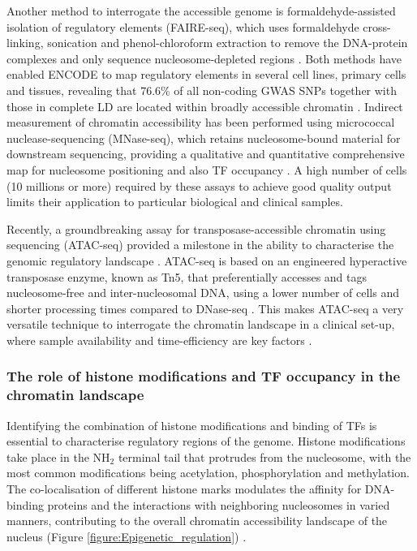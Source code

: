 Another method to interrogate the accessible genome is formaldehyde-assisted isolation of regulatory elements (FAIRE-seq), which uses formaldehyde cross-linking, sonication and phenol-chloroform extraction to remove the DNA-protein complexes and only sequence nucleosome-depleted regions \parencite{Giresi2006}. Both methods have enabled ENCODE to map regulatory elements in several cell lines, primary cells and tissues, revealing that 76.6\% of all non-coding GWAS SNPs together with those in complete LD are located within broadly accessible chromatin  \parencite{ENCODE2007,Buck2014,Gaulton2010, Maurano2012}. 
Indirect measurement of chromatin accessibility has been performed using micrococcal nuclease-sequencing (MNase-seq), which retains nucleosome-bound material for downstream sequencing, providing a qualitative and quantitative comprehensive map for nucleosome positioning and also TF occupancy \parencite{Axel1975,Ponts2010}. A high number of cells (10 millions or more) required by these assays to achieve good quality output limits their application to particular biological and clinical samples. 

Recently, a groundbreaking assay for transposase-accessible chromatin using sequencing (ATAC-seq) provided a milestone in the ability to characterise the genomic regulatory landscape \parencite{Buenrostro2013}. ATAC-seq is based on an engineered hyperactive transposase enzyme, known as Tn5, that preferentially accesses and tags nucleosome-free and inter-nucleosomal DNA, using a lower number of cells and shorter processing times compared to DNase-seq \parencite{Gradman2008, Adey2010}. This makes ATAC-seq a very versatile technique to interrogate the chromatin landscape in a clinical set-up, where sample availability and time-efficiency are key factors \parencite{Scharer2016,Qu2015,Qu2017}. 


\subsubsection{The role of histone modifications and TF occupancy in the chromatin landscape}

Identifying the combination of histone modifications and binding of TFs is essential to characterise regulatory regions of the genome. Histone modifications take place in the NH$_2$ terminal tail that protrudes from the nucleosome, with the most common modifications being acetylation, phosphorylation and methylation. The co-localisation of different histone marks modulates the affinity for DNA-binding proteins and the interactions with neighboring nucleosomes in varied manners, contributing to the overall chromatin accessibility landscape of the nucleus (Figure \ref{figure:Epigenetic_regulation}) \parencite{Jenuwein2001, Bannister2011}.

